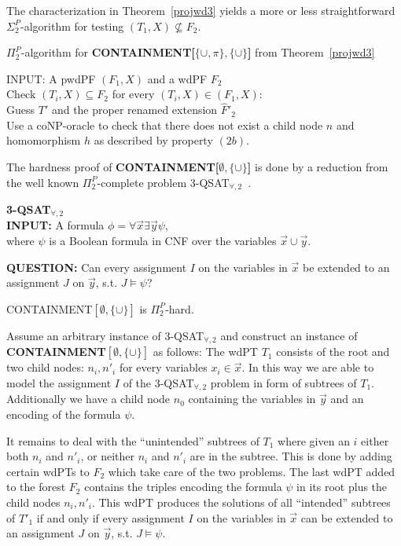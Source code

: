 The characterization in Theorem~\ref{projwd3} yields a more or less
straightforward $\Sigma^P_2$-algorithm for testing $(T_1,X) \not\subseteq
F_2$.
\begin{algorithm}
	\label{alg:pwdpf}
	\caption{$\Pi^P_2$-algorithm for
	\textbf{CONTAINMENT[$\{\cup,\pi\},\{\cup\}$]} from Theorem~\ref{projwd3}}
	INPUT: A pwdPF $(F_1,X)$ and a wdPF $F_2$\\
	Check $(T_i,X) \subseteq F_2$ for every $(T_i,X) \in (F_1,X)$:\\
	Guess $T'$ and the proper renamed extension $\hat{F}'_2$\\
	Use a coNP-oracle to check that there does not exist a child node $n$ and
	homomorphism $h$ as described by property $(2b)$.\\

	
\end{algorithm}

The hardness proof of \textbf{CONTAINMENT[$\emptyset,\{\cup\}$]} is done by a reduction from
the well known $\Pi^P_2$-complete problem 3-QSAT$_{\forall,2}$~\cite{Garey:1979:CIG:578533}.

\begin{framed}\noindent \textbf{3-QSAT$_{\forall,2}$}\\
	\textbf{INPUT:} A formula $\phi= \forall \vec{x}\exists \vec{y} \psi$,\\
	where $\psi$ is a Boolean formula in CNF over the variables
	$\vec{x}\cup\vec{y}$.
	
	\textbf{QUESTION:} Can every assignment $I$ on the variables in $\vec{x}$ be extended
	to an assignment $J$ on $\vec{y}$, s.t. $J \models \psi$?
\end{framed}


\begin{theorem}\label{cemptycup}
	CONTAINMENT$[\emptyset,\{\cup\}]$ is $\Pi^P_2$-hard.
\end{theorem}
\begin{proofidea}
	Assume an arbitrary instance of 3-QSAT$_{\forall,2}$ and construct an
	instance of \textbf{CONTAINMENT$[\emptyset,\{\cup\}]$} as follows: The wdPT $T_1$
	consists of the root and two child nodes: $n_i, n'_i$ for every variables
	$x_i \in \vec{x}$. In this way we are able to model the assignment $I$ of
	the 3-QSAT$_{\forall,2}$ problem in form of subtrees of $T_1$. 
	Additionally we have a child node $n_0$ containing the
	variables in $\vec{y}$ and an encoding of the formula $\psi$. 
	
	It remains to deal with the ``unintended'' subtrees of $T_1$ where given an
	$i$ either both $n_i$ and $n'_i$, or neither $n_i$ and $n'_i$ are in the subtree.
	This is done by adding certain wdPTs to $F_2$ which take care of the two
	problems. The last wdPT added to the forest $F_2$ contains the triples
	encoding the formula $\psi$ in its root plus the child nodes $n_i,n'_i$.
	This wdPT produces the solutions of all ``intended'' subtrees of $T'_1$ if
	and only if every assignment $I$ on the variables in $\vec{x}$ can be
	extended to an assignment $J$ on $\vec{y}$, s.t. $J \models \psi$.
\end{proofidea}

